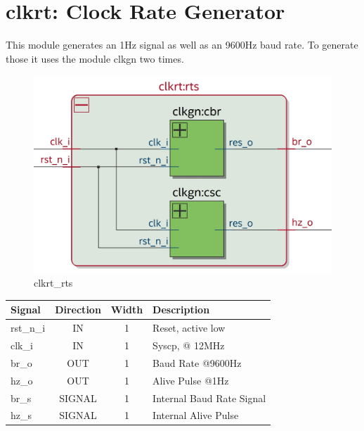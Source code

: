 \documentclass[12pt,a4 paper] {report}
\begin{document}
\section{clkrt: Clock Rate Generator}
This module generates an 1Hz signal as well as an 9600Hz baud rate. To generate those it uses the module clkgn two 
times.
\begin{figure}[h]
	\centering
	\includegraphics[scale=0.15]{../png/clkrt_rts.png}
	\caption{clkrt\_rts}
\end{figure}
\begin{center}
	\begin{tabular}{ | p{2cm} | c | c | p{5cm} |}
		\hline
		\textbf{Signal} & \textbf{Direction} & \textbf{Width} & \textbf{Description} \\
		\hline
		\hline
		rst\_n\_i & IN & 1 & Reset, active low \\
		\hline
		clk\_i & IN & 1 & Syscp, @ 12MHz \\
		\hline
		br\_o & OUT & 1 & Baud Rate @9600Hz \\
		\hline
		hz\_o & OUT & 1 & Alive Pulse @1Hz \\
		\hline
		\hline
		br\_s & SIGNAL & 1 & Internal Baud Rate Signal \\
		\hline	
		hz\_s & SIGNAL & 1 & Internal Alive Pulse \\
		\hline	
	\end{tabular}
\end{center}

\newpage
\end{document}
